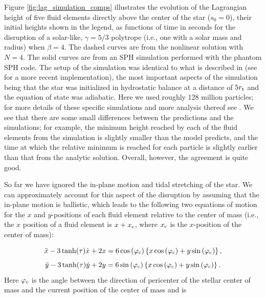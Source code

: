 \documentclass[twocolumn]{aastex62}
\begin{document}
Figure \ref{fig:lag_simulation_comps} illustrates the evolution of the Lagrangian height of five fluid elements directly above the center of the star ($s_0 = 0$), their initial heights shown in the legend, as functions of time in seconds for the disruption of a solar-like, $\gamma = 5/3$ polytrope (i.e., one with a solar mass and radius) when $\beta = 4$. The dashed curves are from the nonlinear solution with $N = 4$. The solid curves are from an SPH simulation performed with the {\sc phantom} \citep{Price:2018aa} SPH code. The setup of the simulation was identical to what is described in \citet{Coughlin:2015aa} (see \citealt{Miles:2020aa} for a more recent implementation), the most important aspects of the simulation being that the star was initialized in hydrostatic balance at a distance of $5r_{\rm t}$ and the equation of state was adiabatic. Here we used roughly 128 million particles; for more details of these specific simulations and more analysis thereof see \citet{norman21}. We see that there are some small differences between the predictions and the simulations; for example, the minimum height reached by each of the fluid elements from the simulation is slightly smaller than the model predicts, and the time at which the relative minimum is reached for each particle is slightly earlier than that from the analytic solution. Overall, however, the agreement is quite good.

So far we have ignored the in-plane motion and tidal stretching of the star. We can approximately account for this aspect of the disruption by assuming that the in-plane motion is ballistic, which leads to the following two equations of motion for the $x$ and $y$-positions of each fluid element relative to the center of mass (i.e., the $x$ position of a fluid element is $x+x_{\rm c}$, where $x_{\rm c}$ is the $x$-position of the center of mass):

\begin{equation*}
\ddot{x}-3\tanh(\tau)\dot{x}+2x = 6\cos\left(\varphi_{\rm c}\right)\left\{x\cos\left(\varphi_{\rm c}\right)+y\sin\left(\varphi_{\rm c}\right)\right\},
\end{equation*} 
\begin{equation*}
\ddot{y}-3\tanh(\tau)\dot{y}+2y = 6\sin\left(\varphi_{\rm c}\right)\left\{x\cos\left(\varphi_{\rm c}\right)+y\sin\left(\varphi_{\rm c}\right)\right\}.
\end{equation*} 
Here $\varphi_{\rm c}$ is the angle between the direction of pericenter of the stellar center of mass and the current position of the center of mass and is
\end{document}
